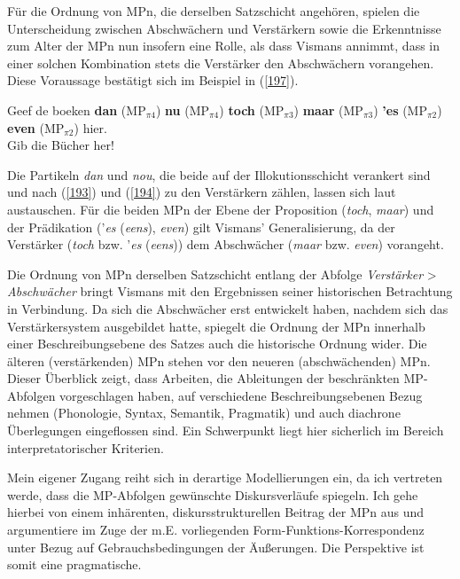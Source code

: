 Für die Ordnung von MPn, die derselben Satzschicht angehören, spielen die Unterscheidung zwischen Abschwächern und Verstärkern sowie die Erkenntnisse zum Alter der MPn nun insofern eine Rolle, als dass Vismans annimmt, dass in einer solchen Kombination stets die Verstärker den Abschwächern vo\-rangehen. Diese Voraussage bestätigt sich im Beispiel in (\ref{197}).
	
\begin{exe}
	\ex\label{197} 
	Geef de boeken \textbf{dan} ($\textrm{MP}_{\pi4}$) \textbf{nu} ($\textrm{MP}_{\pi4}$) \textbf{toch} ($\textrm{MP}_{\pi3}$) \textbf{maar} ($\textrm{MP}_{\pi3}$) \textbf{'es} ($\textrm{MP}_{\pi2}$) \textbf{even} ($\textrm{MP}_{\pi2}$) hier.\\
	Gib die Bücher her!
	\hbox{}\hfill\hbox{\citet[98]{Hoogvliet1903}}
\end{exe}	
Die Partikeln \textit{dan} und \textit{nou}, die beide auf der Illokutionsschicht  verankert sind und nach (\ref{193}) und (\ref{194}) zu den Verstärkern zählen, lassen sich laut  austauschen. Für die beiden MPn der Ebene der Proposition  (\textit{toch}, \textit{maar}) und der Prädikation  ('\textit{es} (\textit{eens}), \textit{even}) gilt Vismans' Generalisierung, da der Verstärker (\textit{toch} bzw. '\textit{es} (\textit{eens})) dem Abschwächer (\textit{maar} bzw. \textit{even}) vorangeht. 

Die Ordnung von MPn derselben Satzschicht entlang der Abfolge \textit{Verstärker} > \textit{Abschwächer} bringt Vismans mit den Ergebnissen seiner historischen Betrachtung in Verbindung. Da sich die Abschwächer erst entwickelt haben, nachdem sich das Verstärkersystem ausgebildet hatte, spiegelt die Ordnung der MPn innerhalb einer Beschreibungsebene des Satzes auch die historische Ordnung wider. Die älteren (verstärkenden) MPn stehen vor den neueren (abschwächenden) MPn.\\

\noindent
Dieser Überblick zeigt, dass Arbeiten, die Ableitungen der beschränkten MP-Abfolgen vorgeschlagen haben, auf verschiedene Beschreibungsebenen Bezug nehmen (Phonologie, Syntax, Semantik, Pragmatik) und auch diachrone Überlegungen eingeflossen sind. Ein Schwerpunkt liegt hier sicherlich im Bereich interpretatorischer Kriterien.

Mein eigener Zugang reiht sich in derartige Modellierungen ein, da ich vertre\-ten werde, dass die MP-Abfolgen gewünschte Diskursverläufe spiegeln. Ich gehe hier\-bei von einem inhärenten, diskursstrukturellen Beitrag der MPn aus und argumentiere im Zuge der m.E. vorliegenden Form-Funktions-Korrespondenz unter Bezug auf Gebrauchsbedingungen der Äußerungen. Die Perspektive ist somit eine pragmatische.

